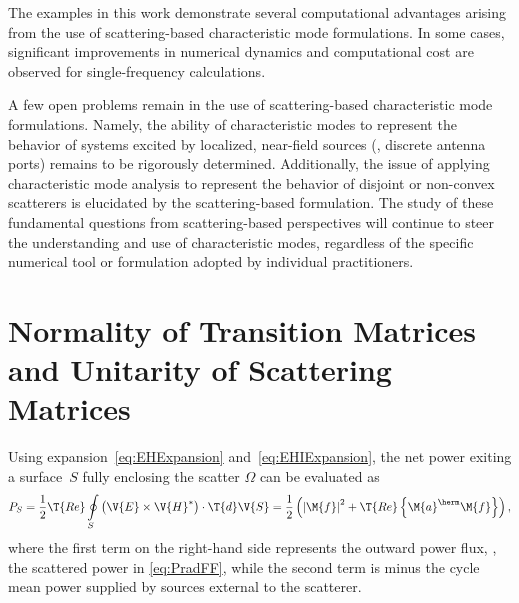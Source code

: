 \documentclass[journal]{IEEEtran}
\begin{document}
The examples in this work demonstrate several computational advantages arising from the use of scattering-based characteristic mode formulations. In some cases, significant improvements in numerical dynamics and computational cost are observed for single-frequency calculations.  

A few open problems remain in the use of scattering-based characteristic mode formulations.  Namely, the ability of characteristic modes to represent the behavior of systems excited by localized, near-field sources (\eg{}, discrete antenna ports) remains to be rigorously determined. Additionally, the issue of applying characteristic mode analysis to represent the behavior of disjoint or non-convex scatterers is elucidated by the scattering-based formulation.  The study of these fundamental questions from scattering-based perspectives will continue to steer the understanding and use of characteristic modes, regardless of the specific numerical tool or formulation adopted by individual practitioners.  

\appendices

\section{Normality of Transition Matrices and Unitarity of Scattering Matrices}
\label{app:Sunitary}
Using expansion~\eqref{eq:EHExpansion} and~\eqref{eq:EHIExpansion}, the net power exiting a surface~$S$ fully enclosing the scatter $\varOmega$
can be evaluated as~\cite{Kristensson_ScatteringBook}
\begin{equation}
\label{eq:appUnit:2}
P_S = \dfrac{1}{2} \T{Re} \oint \limits_S \left( \V{E} \times \V{H}^* \right) \cdot \T{d}\V{S} = \dfrac{1}{2} \left( \left| \M{f} \right|^2 + \T{Re} \left\{ \M{a}^\herm \M{f} \right\} \right),
\end{equation}
where the first term on the right-hand side represents the outward power flux, \ie{}, the scattered power in \eqref{eq:PradFF}, while the second term is minus the cycle mean power supplied by sources external to the scatterer.
\end{document}
